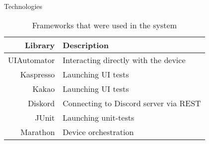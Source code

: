 \documentclass{beamer}%
\begin{document}
\begin{frame}{Technologies}
\begin{changemargin}
\footnotesize


\begin{table}[h]
\caption{Frameworks that were used in the system}
\centering\begin{tabular}{rl}
\toprule
Library     & Description                           \\
\midrule
UIAutomator & Interacting directly with the device  \\
Kaspresso   & Launching UI tests                    \\
Kakao       & Launching UI tests                    \\
Diskord     & Connecting to Discord server via REST \\
JUnit       & Launching unit-tests                  \\
Marathon    & Device orchestration                  \\
\bottomrule
\end{tabular}
\label{table:libraries}
\end{table}


\end{changemargin}
\end{frame}
\end{document}
